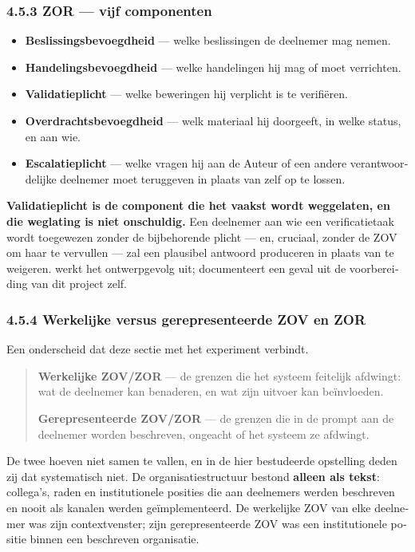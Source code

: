 \begin{dutch}
\subsubsection*{4.5.3 ZOR — vijf componenten}
\label{sec:nl:4.5.3}

\begin{itemize}
  \item \textbf{Beslissingsbevoegdheid} — welke beslissingen de deelnemer mag nemen.
  \item \textbf{Handelingsbevoegdheid} — welke handelingen hij mag of moet verrichten.
  \item \textbf{Validatieplicht} — welke beweringen hij verplicht is te verifiëren.
  \item \textbf{Overdrachtsbevoegdheid} — welk materiaal hij doorgeeft, in welke status, en aan wie.
  \item \textbf{Escalatieplicht} — welke vragen hij aan de Auteur of een andere verantwoordelijke deelnemer moet teruggeven in plaats van zelf op te lossen.
\end{itemize}
\textbf{Validatieplicht is de component die het vaakst wordt weggelaten, en die weglating is niet onschuldig.} Een deelnemer aan wie een verificatietaak wordt toegewezen zonder de bijbehorende plicht — en, cruciaal, zonder de ZOV om haar te vervullen — zal een plausibel antwoord produceren in plaats van te weigeren.  werkt het ontwerpgevolg uit;  documenteert een geval uit de voorbereiding van dit project zelf.


\subsubsection*{4.5.4 Werkelijke versus gerepresenteerde ZOV en ZOR}
\label{sec:nl:4.5.4}

Een onderscheid dat deze sectie met het experiment verbindt.

\begin{quote}
\textbf{Werkelijke ZOV/ZOR} — de grenzen die het systeem feitelijk afdwingt: wat de deelnemer kan benaderen, en wat zijn uitvoer kan beïnvloeden.

\textbf{Gerepresenteerde ZOV/ZOR} — de grenzen die in de prompt aan de deelnemer worden beschreven, ongeacht of het systeem ze afdwingt.
\end{quote}
De twee hoeven niet samen te vallen, en in de hier bestudeerde opstelling deden zij dat systematisch niet. De organisatiestructuur bestond \textbf{alleen als tekst}: collega's, raden en institutionele posities die aan deelnemers werden beschreven en nooit als kanalen werden geïmplementeerd. De werkelijke ZOV van elke deelnemer was zijn contextvenster; zijn gerepresenteerde ZOV was een institutionele positie binnen een beschreven organisatie.


\end{dutch}
